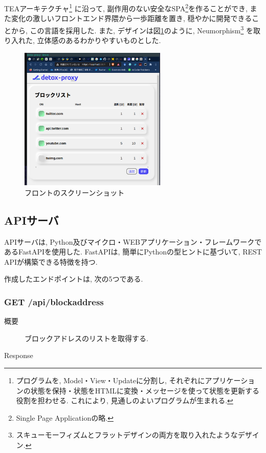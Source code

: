 \documentclass[10pt,a4paper,uplatex,a4j,dvipdfmx]{jsarticle}
\begin{document}
\begin{multicols}{2}
    TEAアーキテクチャ\footnote{プログラムを, Model・View・Updateに分割し, それぞれにアプリケーションの状態を保持・状態をHTMLに変換・メッセージを使って状態を更新する役割を担わせる. これにより, 見通しのよいプログラムが生まれる.\cite{elm:tea}}
    に沿って, 副作用のない安全なSPA\footnote{Single Page Applicationの略.}を作ることができ, また変化の激しいフロントエンド界隈から一歩距離を置き, 穏やかに開発できることから, この言語を採用した.
    また, デザインは図\ref{img:front}のように, Neumorphism\footnote{スキューモーフィズムとフラットデザインの両方を取り入れたようなデザイン.}
    を取り入れた, 立体感のあるわかりやすいものとした.
    
    \begin{figure}[H]
      \center
      \includegraphics[width=7cm]{img/front.png}
      \caption{フロントのスクリーンショット \label{img:front}}
    \end{figure}
    

    \subsection{APIサーバ}
    
    APIサーバは, Python及びマイクロ・WEBアプリケーション・フレームワークであるFastAPI\cite{fastapi}を使用した. FastAPIは, 簡単にPythonの型ヒントに基づいて, REST APIが構築できる特徴を持つ.
    
    作成したエンドポイントは, 次の5つである.
    
       \subsubsection*{GET /api/blockaddress}
          \begin{description}
            \item[概要] ブロックアドレスのリストを取得する.
            \item[Response] 
          \end{description}


\end{multicols}
\end{document}
